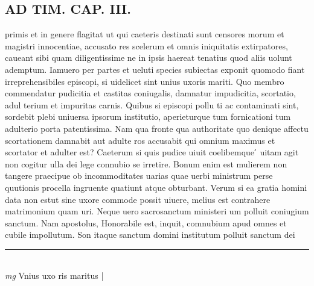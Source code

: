 \documentclass{article}
\begin{document}
\begin{pages}
\section*{AD TIM. CAP. III. }
\marginpar{[ p.124 ]}\pstart primis et in genere flagitat ut qui caeteris destinati sunt censores morum et magistri innocentiae, accusato res scelerum et omnis iniquitatis extirpatores, caueant sibi quam diligentissime ne in ipsis haereat tenatius quod aliis uolunt ademptum. Iamuero per partes et ueluti species subiectas exponit quomodo fiant irreprehensibiles episcopi, si uidelicet sint unius uxoris mariti. Quo membro commendatur pudicitia et castitas coniugalis, damnatur impudicitia, scortatio, adul terium et impuritas carnis. Quibus si episcopi pollu ti ac contaminati sint, sordebit plebi uniuersa ipsorum institutio, aperieturque tum fornicationi tum adulterio porta patentissima. Nam qua fronte qua authoritate quo denique affectu scortationem damnabit aut adulte ros accusabit qui omnium maximus et scortator et adulter est? Caeterum si quis pudice uiuit coelibemque ́ uitam agit non cogitur ulla dei lege connubio se irretire. Bonum enim est mulierem non tangere praecipue ob incommoditates uarias quae uerbi ministrum perse quutionis procella ingruente quatiunt atque obturbant. Verum si ea gratia homini data non estut sine uxore commode possit uiuere, melius est contrahere matrimonium quam uri. Neque uero sacrosanctum ministeri um polluit coniugium sanctum. Nam apostolus, Honorabile est, inquit, comnubium apud omnes et cubile impollutum. Son itaque sanctum domini institutum polluit sanctum dei  \pend
\vspace{0.5cm}\noindent
\vspace{0.2cm}\rule{1cm}{0.2pt}\\ 
\hspace{0.2cm}\textit{mg}
\footnotesize Vnius uxo ris maritus 
\normalsize| 

\end{pages}
\end{document}
